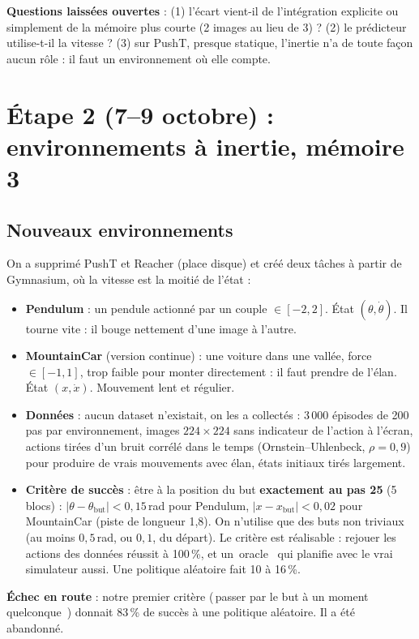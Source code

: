 \documentclass[11pt,a4paper]{article}
\newcommand{\og}{\guillemotleft\,\ignorespaces}
\newcommand{\fg}{\unskip\,\guillemotright}
\begin{document}
\textbf{Questions laissées ouvertes} : (1) l'écart vient-il de l'intégration explicite ou
simplement de la mémoire plus courte (2 images au lieu de 3) ? (2) le prédicteur
utilise-t-il la vitesse ? (3) sur PushT, presque statique, l'inertie n'a de toute façon
aucun rôle : il faut un environnement où elle compte.

\section{Étape 2 (7--9 octobre) : environnements à inertie, mémoire 3}
\label{sec:g9}

\subsection{Nouveaux environnements}

On a supprimé PushT et Reacher (place disque) et créé deux tâches à partir de Gymnasium, où
la vitesse est la moitié de l'état :
\begin{itemize}
  \item \textbf{Pendulum} : un pendule actionné par un couple $\in [-2, 2]$. État
  $(\theta, \dot\theta)$. Il tourne vite : il bouge nettement d'une image à l'autre.
  \item \textbf{MountainCar} (version continue) : une voiture dans une vallée, force
  $\in [-1, 1]$, trop faible pour monter directement : il faut prendre de l'élan. État
  $(x, \dot x)$. Mouvement lent et régulier.
  \item \textbf{Données} : aucun dataset n'existait, on les a collectés : 3\,000 épisodes de
  200 pas par environnement, images $224\times224$ sans indicateur de l'action à l'écran,
  actions tirées d'un bruit corrélé dans le temps (Ornstein--Uhlenbeck, $\rho = 0{,}9$) pour
  produire de vrais mouvements avec élan, états initiaux tirés largement.
  \item \textbf{Critère de succès} : être à la position du but \textbf{exactement au pas 25}
  (5 blocs) : $|\theta - \theta_{\text{but}}| < 0{,}15$\,rad pour Pendulum,
  $|x - x_{\text{but}}| < 0{,}02$ pour MountainCar (piste de longueur 1,8). On n'utilise que
  des buts non triviaux (au moins $0{,}5$\,rad, ou $0{,}1$, du départ). Le critère est
  réalisable : rejouer les actions des données réussit à 100\,\%, et un \og oracle \fg{} qui
  planifie avec le vrai simulateur aussi. Une politique aléatoire fait 10 à 16\,\%.
\end{itemize}
\textbf{Échec en route} : notre premier critère (\og passer par le but à un moment
quelconque \fg{}) donnait 83\,\% de succès à une politique aléatoire. Il a été abandonné.
\end{document}
